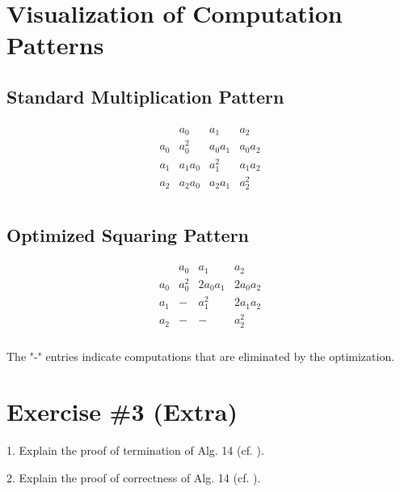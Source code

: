 \documentclass{article}
\begin{document}
\section{Visualization of Computation Patterns}

\subsection{Standard Multiplication Pattern}
\begin{align*}
\begin{array}{c|ccc}
    & a_0 & a_1 & a_2 \\
\hline
a_0 & a_0^2 & a_0a_1 & a_0a_2 \\
a_1 & a_1a_0 & a_1^2 & a_1a_2 \\
a_2 & a_2a_0 & a_2a_1 & a_2^2 \\
\end{array}
\end{align*}

\subsection{Optimized Squaring Pattern}
\begin{align*}
\begin{array}{c|ccc}
    & a_0 & a_1 & a_2 \\
\hline
a_0 & a_0^2 & 2a_0a_1 & 2a_0a_2 \\
a_1 & - & a_1^2 & 2a_1a_2 \\
a_2 & - & - & a_2^2 \\
\end{array}
\end{align*}

The "-" entries indicate computations that are eliminated by the optimization.

\section*{Exercise \#3 (Extra)}

1. Explain the proof of termination of Alg. 14 (cf. \cite[p. 605]{HAC}).

2. Explain the proof of correctness of Alg. 14 (cf. \cite[p. 605]{HAC}).

\printbibliography
\end{document}
